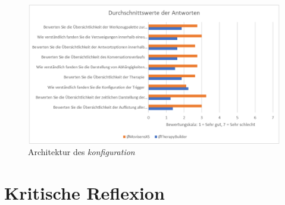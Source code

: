 \begin{figure}[h]
\centering
\includegraphics[width=1\textwidth]{pictures/diagramme/antwortendurchsch2}
\caption{Architektur des \emph{konfiguration}}
\label{antwortendurchsch2}
\end{figure}


\section{Kritische Reflexion}